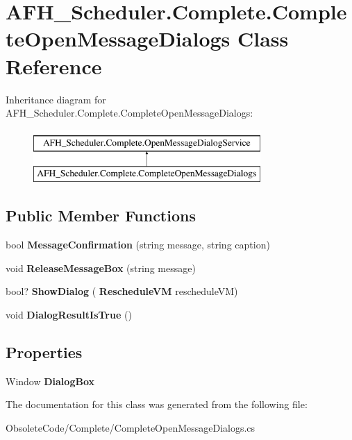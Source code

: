 \section{A\+F\+H\+\_\+\+Scheduler.\+Complete.\+Complete\+Open\+Message\+Dialogs Class Reference}
\label{class_a_f_h___scheduler_1_1_complete_1_1_complete_open_message_dialogs}
Inheritance diagram for A\+F\+H\+\_\+\+Scheduler.\+Complete.\+Complete\+Open\+Message\+Dialogs\+:\begin{figure}[H]
\begin{center}
\leavevmode
\includegraphics[height=2.000000cm]{class_a_f_h___scheduler_1_1_complete_1_1_complete_open_message_dialogs}
\end{center}
\end{figure}
\subsection*{Public Member Functions}
\begin{DoxyCompactItemize}
\item 
\mbox{\label{class_a_f_h___scheduler_1_1_complete_1_1_complete_open_message_dialogs_a88232e4d008947362bc9852f269c092b}} 
bool {\bfseries Message\+Confirmation} (string message, string caption)
\item 
\mbox{\label{class_a_f_h___scheduler_1_1_complete_1_1_complete_open_message_dialogs_af36cb311b42b4a8a7d4c271f15b47f1b}} 
void {\bfseries Release\+Message\+Box} (string message)
\item 
\mbox{\label{class_a_f_h___scheduler_1_1_complete_1_1_complete_open_message_dialogs_a1f77caa18260f8ed736296442d04e187}} 
bool? {\bfseries Show\+Dialog} (\textbf{ Reschedule\+VM} reschedule\+VM)
\item 
\mbox{\label{class_a_f_h___scheduler_1_1_complete_1_1_complete_open_message_dialogs_a63225b080d28fc84dccf48df37a4ac5a}} 
void {\bfseries Dialog\+Result\+Is\+True} ()
\end{DoxyCompactItemize}
\subsection*{Properties}
\begin{DoxyCompactItemize}
\item 
\mbox{\label{class_a_f_h___scheduler_1_1_complete_1_1_complete_open_message_dialogs_af7da24a59025d711496bac873d3114e8}} 
Window {\bfseries Dialog\+Box}\hspace{0.3cm}{\ttfamily  [get, set]}
\end{DoxyCompactItemize}


The documentation for this class was generated from the following file\+:\begin{DoxyCompactItemize}
\item 
Obsolete\+Code/\+Complete/Complete\+Open\+Message\+Dialogs.\+cs\end{DoxyCompactItemize}
